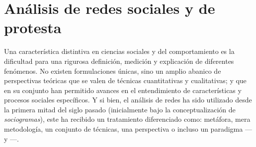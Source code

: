 \documentclass[letterpaper, 11pt]{book}
\theoremstyle{definition}
\theoremstyle{remark}
\begin{document}
\section{Análisis de redes sociales y de protesta}
\label{sec:AnalisisRedesProtestas}

Una característica distintiva en ciencias sociales y del comportamiento es la dificultad para una rigurosa definición, medición y explicación de diferentes fenómenos. 
No existen formulaciones únicas, sino un amplio abanico de perspectivas teóricas que se valen de técnicas cuantitativas y cualitativas; y que en su conjunto han permitido avances en el entendimiento de características y procesos sociales específicos. 
Y si bien, el análisis de redes ha sido utilizado desde la primera mitad del siglo pasado 
(inicialmente bajo la conceptualización de \emph{sociogramas}), este ha recibido un tratamiento diferenciado como: metáfora, mera metodología, un conjunto de técnicas, una perspectiva o incluso un paradigma ---\citet{1988_Wellman_StructuralAnalysis} y \citet{2011_Wellman_SNA_Introduction}---.
\end{document}
